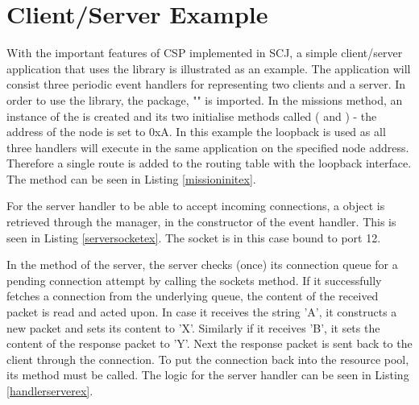 \section{Client/Server Example} %
\label{sec:client_server_example}
With the important features of CSP implemented in SCJ, a simple client/server application that uses the library is illustrated as an example. The application will consist three periodic event handlers for representing two clients and a server. In order to use the library, the package, "" is imported. In the missions  method, an instance of the  is created and its two initialise methods called ( and ) - the address of the node is set to 0xA. In this example the loopback is used as all three handlers will execute in the same application on the specified node address. Therefore a single route is added to the routing table with the loopback interface. The  method can be seen in Listing \ref{missioninitex}. 



For the server handler to be able to accept incoming connections, a  object is retrieved through the manager, in the constructor of the event handler. This is seen in Listing \ref{serversocketex}. The socket is in this case bound to port 12.



In the  method of the server, the server checks (once) its connection queue for a pending connection attempt by calling the sockets  method. If it successfully fetches a connection from the underlying queue, the content of the received packet is read and acted upon. In case it receives the string 'A', it constructs a new packet and sets its content to 'X'. Similarly if it receives 'B', it sets the content of the response packet to 'Y'. Next the response packet is sent back to the client through the connection. To put the connection back into the resource pool, its  method must be called. The logic for the server handler can be seen in Listing \ref{handlerserverex}.



